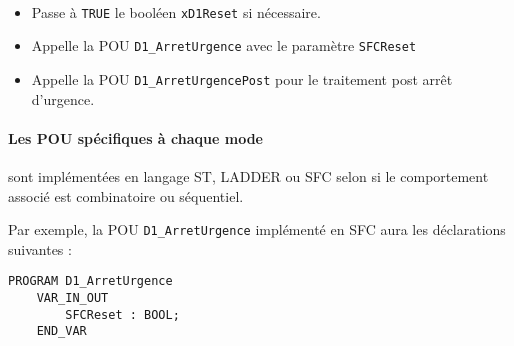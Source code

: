 \lstDeleteShortInline~
\pagebreak
\begin{UPSTIactivite}
    \begin{itemize}
        \item Passe à \lstinline{TRUE} le booléen \lstinline{xD1Reset} si nécessaire.
        \item Appelle la POU \lstinline{D1_ArretUrgence} avec le paramètre \lstinline{SFCReset}
        \item Appelle la POU \lstinline{D1_ArretUrgencePost} pour le traitement post arrêt d'urgence.
    \end{itemize}
    \vspace{15cm}
\end{UPSTIactivite}

\paragraph{Les POU spécifiques à chaque mode} sont implémentées en langage ST, LADDER ou SFC selon si le comportement associé est combinatoire ou séquentiel.

Par exemple, la POU \lstinline{D1_ArretUrgence} implémenté en SFC aura les déclarations suivantes :

\begin{lstlisting}
PROGRAM D1_ArretUrgence
    VAR_IN_OUT
        SFCReset : BOOL;
    END_VAR\end{lstlisting}



